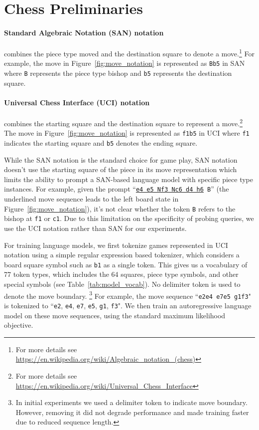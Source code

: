 \documentclass[12pt]{thesis-umich}[thesis]
\newcommand{\pos}[1]{\texttt{#1}}
\begin{document}
 	
	 
	 

 
\section{Chess Preliminaries}
\label{sec:chess}

\paragraph{Standard Algebraic Notation (SAN) notation}
combines the piece type moved and the destination square to denote a move.\footnote{For more details see \url{https://en.wikipedia.org/wiki/Algebraic_notation_(chess)}}
For example, the move in Figure~\ref{fig:move_notation} is represented as \texttt{Bb5} in SAN where \texttt{B} represents the piece type bishop and \texttt{b5} represents the destination square.

\paragraph{Universal Chess Interface (UCI) notation}
combines the starting square and the destination square to represent a move.\footnote{For more details see \url{https://en.wikipedia.org/wiki/Universal_Chess_Interface}} 
The move in Figure~\ref{fig:move_notation} is represented as \texttt{f1b5} in UCI where \texttt{f1} indicates the starting square and \texttt{b5} denotes the ending square.


While the SAN notation is the standard choice for game play, SAN notation doesn't use the starting square of the piece in its move representation which limits the ability to prompt a SAN-based language model with specific piece type instances.
For example, given the prompt ``\texttt{\underline{e4 e5 Nf3 Nc6 d4 h6} B}'' (the underlined move sequence leads to the left board state in Figure~\ref{fig:move_notation}), it's not clear whether the token \texttt{B} refers to the bishop at \texttt{f1} or \texttt{c1}. Due to this limitation on the specificity of probing queries, we use the UCI notation rather than SAN for our experiments.


For training language models, we first tokenize games represented in UCI notation using a simple regular expression based tokenizer, which considers a board square symbol such as \texttt{b1} as a single token.
This gives us a vocabulary of 77 token types, 
which includes the 64 squares, piece type symbols, and other special symbols (see Table~\ref{tab:model_vocab}). 
No delimiter token is used to denote the move boundary. 
\footnote{In initial experiments we used a delimiter token to indicate move boundary. However, removing it did not degrade performance and made training faster due to reduced sequence length.}
For example, the move sequence ``\pos{e2e4 e7e5 g1f3}" is tokenized to ``\pos{e2}, \pos{e4}, \pos{e7}, \pos{e5}, \pos{g1}, \pos{f3}". We then train an autoregressive language model on these move sequences, using the standard maximum likelihood objective.
\end{document}

